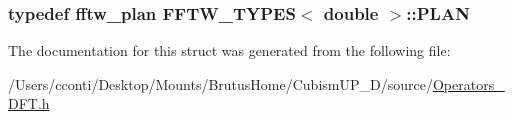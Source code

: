 \subsubsection[{P\+L\+A\+N}]{\setlength{\rightskip}{0pt plus 5cm}typedef fftw\+\_\+plan {\bf F\+F\+T\+W\+\_\+\+T\+Y\+P\+E\+S}$<$ double $>$\+::{\bf P\+L\+A\+N}}\label{struct_f_f_t_w___t_y_p_e_s_3_01double_01_4_a19c1538d166a5a9f01680c00253850ac}


The documentation for this struct was generated from the following file\+:\begin{DoxyCompactItemize}
\item 
/\+Users/cconti/\+Desktop/\+Mounts/\+Brutus\+Home/\+Cubism\+U\+P\+\_\+D/source/\hyperlink{_operators___d_f_t_8h}{Operators\+\_\+\+D\+F\+T.\+h}\end{DoxyCompactItemize}
